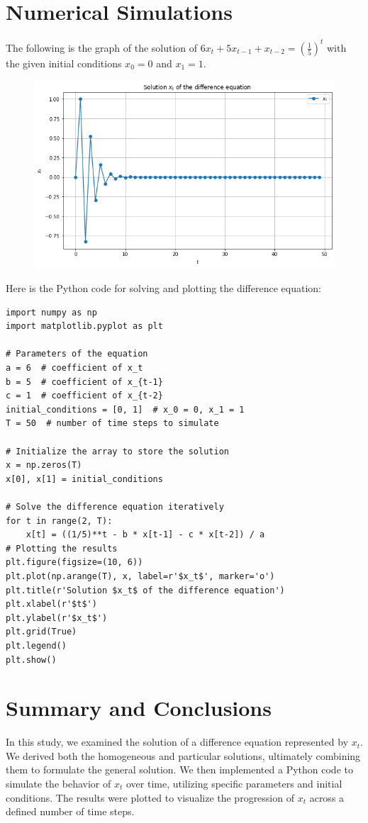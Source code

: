 \documentclass [a4paper]{article}
\begin{document}
\section{Numerical Simulations}
The following is the graph of  the solution of \(6x_t + 5x_{t-1} + x_{t-2} = \left(\frac{1}{5}\right)^t\) with the given initial conditions \(x_0 = 0\) and \(x_1 = 1\).
\begin{figure}[h]
    \centering
    \includegraphics[width=1\textwidth]{MAT 196 Lab Activity 2}
\end{figure}

\noindent Here is the Python code for solving and plotting the difference equation:

\begin{lstlisting}
import numpy as np
import matplotlib.pyplot as plt

# Parameters of the equation
a = 6  # coefficient of x_t
b = 5  # coefficient of x_{t-1}
c = 1  # coefficient of x_{t-2}
initial_conditions = [0, 1]  # x_0 = 0, x_1 = 1
T = 50  # number of time steps to simulate

# Initialize the array to store the solution
x = np.zeros(T)
x[0], x[1] = initial_conditions

# Solve the difference equation iteratively
for t in range(2, T):
    x[t] = ((1/5)**t - b * x[t-1] - c * x[t-2]) / a
# Plotting the results
plt.figure(figsize=(10, 6))
plt.plot(np.arange(T), x, label=r'$x_t$', marker='o')
plt.title(r'Solution $x_t$ of the difference equation')
plt.xlabel(r'$t$')
plt.ylabel(r'$x_t$')
plt.grid(True)
plt.legend()
plt.show()
\end{lstlisting}

\section{Summary and Conclusions}
In this study, we examined the solution of a difference equation represented by \(x_t\). We derived both the homogeneous and particular solutions, ultimately combining them to formulate the general solution. We then implemented a Python code to simulate the behavior of \(x_t\) over time, utilizing specific parameters and initial conditions. The results were plotted to visualize the progression of \(x_t\) across a defined number of time steps.
\end{document}
